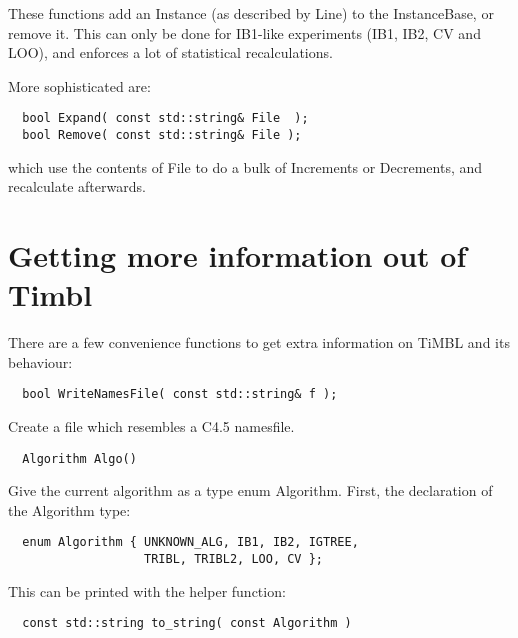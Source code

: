 \documentclass{report}
\begin{document}
These functions add an Instance (as described by Line) to the
InstanceBase, or remove it.  This can only be done for IB1-like
experiments (IB1, IB2, CV and LOO), and enforces a lot of
statistical recalculations.

More sophisticated are:

\begin{footnotesize}
\begin{verbatim}
  bool Expand( const std::string& File  );
  bool Remove( const std::string& File );
\end{verbatim}
\end{footnotesize}

which use the contents of File to do a bulk of Increments or Decrements, and
recalculate afterwards.

\section{Getting more information out of Timbl}

There are a few convenience functions to get extra information on
TiMBL and its behaviour:

\begin{footnotesize}
\begin{verbatim}
  bool WriteNamesFile( const std::string& f );
\end{verbatim}
\end{footnotesize}

Create a file which resembles a C4.5 namesfile.

\begin{footnotesize}
\begin{verbatim}
  Algorithm Algo()
\end{verbatim}
\end{footnotesize}

Give the current algorithm as a type enum Algorithm. First, the
declaration of the Algorithm type:

\begin{footnotesize}
\begin{verbatim}
  enum Algorithm { UNKNOWN_ALG, IB1, IB2, IGTREE, 
                   TRIBL, TRIBL2, LOO, CV };
\end{verbatim}
\end{footnotesize}

This can be printed with the helper function: 

\begin{footnotesize}
\begin{verbatim}
  const std::string to_string( const Algorithm )
\end{verbatim}
\end{footnotesize}
\end{document}
